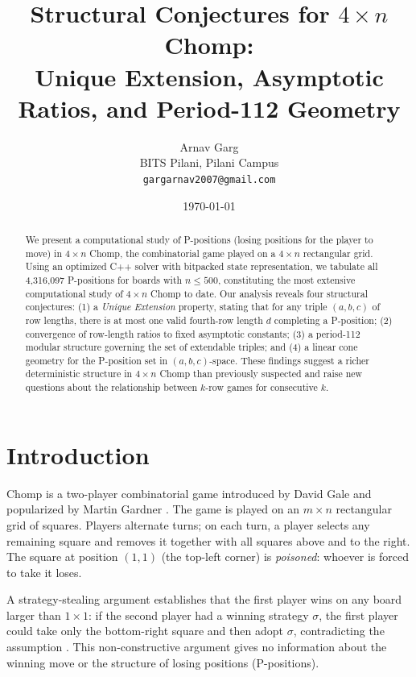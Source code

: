 \documentclass[12pt]{article}
\title{Structural Conjectures for $4 \times n$ Chomp:\\
Unique Extension, Asymptotic Ratios, and Period-112 Geometry}
\author{Arnav Garg \\
\small BITS Pilani, Pilani Campus \\
\small \texttt{gargarnav2007@gmail.com}}
\date{\today}
\begin{document}
\maketitle

\begin{abstract}
We present a computational study of P-positions (losing positions for
the player to move) in $4 \times n$ Chomp, the combinatorial game
played on a $4 \times n$ rectangular grid. Using an optimized C++
solver with bitpacked state representation, we tabulate all 4,316,097
P-positions for boards with $n \leq 500$, constituting the most
extensive computational study of $4 \times n$ Chomp to date.
Our analysis reveals four structural conjectures: (1) a \emph{Unique
Extension} property, stating that for any triple $(a,b,c)$ of row
lengths, there is at most one valid fourth-row length $d$ completing
a P-position; (2) convergence of row-length ratios to fixed asymptotic
constants; (3) a period-112 modular structure governing the set of
extendable triples; and (4) a linear cone geometry for the P-position
set in $(a,b,c)$-space. These findings suggest a richer deterministic
structure in $4 \times n$ Chomp than previously suspected and raise
new questions about the relationship between $k$-row games for
consecutive $k$.
\end{abstract}

\section{Introduction}

Chomp is a two-player combinatorial game introduced by David Gale
\cite{gale1974} and popularized by Martin Gardner \cite{gardner1973}.
The game is played on an $m \times n$ rectangular grid of squares.
Players alternate turns; on each turn, a player selects any remaining
square and removes it together with all squares above and to the right.
The square at position $(1,1)$ (the top-left corner) is \emph{poisoned}:
whoever is forced to take it loses.

A strategy-stealing argument establishes that the first player wins on
any board larger than $1 \times 1$: if the second player had a winning
strategy $\sigma$, the first player could take only the bottom-right
square and then adopt $\sigma$, contradicting the assumption
\cite{berlekamp2001}. This non-constructive argument gives no
information about the winning move or the structure of losing positions
(P-positions).
\end{document}
